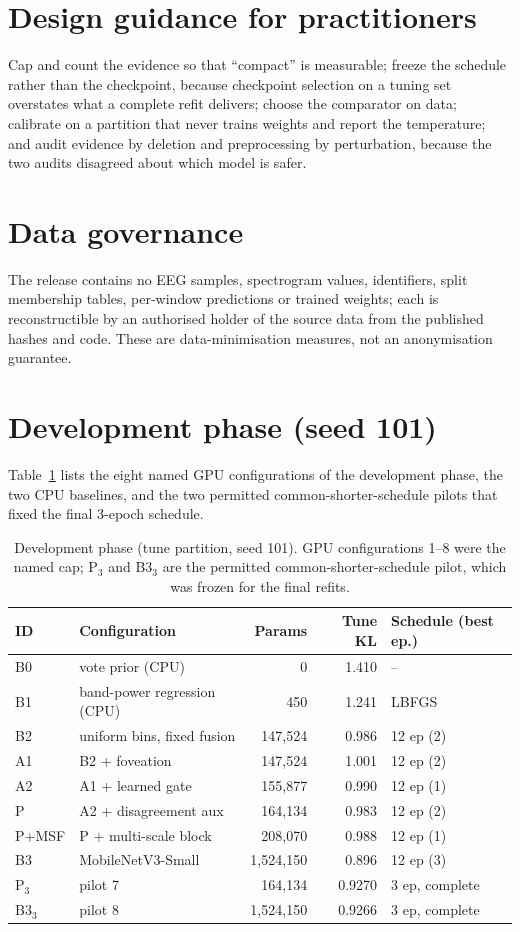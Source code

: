 \documentclass[manuscript,anonymous,nonacm]{acmart}
\begin{document}
\section{Design guidance for practitioners}
Cap and count the evidence so that ``compact'' is measurable; freeze the schedule rather than the checkpoint, because checkpoint selection on a tuning set overstates what a complete refit delivers; choose the comparator on data; calibrate on a partition that never trains weights and report the temperature; and audit evidence by deletion and preprocessing by perturbation, because the two audits disagreed about which model is safer.


\section{Data governance}
The release contains no EEG samples, spectrogram values, identifiers, split membership tables, per-window predictions or trained weights; each is reconstructible by an authorised holder of the source data from the published hashes and code. These are data-minimisation measures, not an anonymisation guarantee.


\section{Development phase (seed 101)}
Table~\ref{tab:devsup} lists the eight named GPU configurations of the development phase, the two CPU baselines, and the two permitted common-shorter-schedule pilots that fixed the final 3-epoch schedule.
\begin{table}[htbp]
\caption{Development phase (tune partition, seed 101). GPU configurations 1--8 were the named cap; P$_3$ and B3$_3$ are the permitted common-shorter-schedule pilot, which was frozen for the final refits.}
\label{tab:devsup}
\footnotesize
\setlength{\tabcolsep}{3.5pt}
\begin{tabular}{llrrl}
\toprule
ID & Configuration & Params & Tune KL & Schedule (best ep.) \\
\midrule
B0 & vote prior (CPU) & 0 & 1.410 & -- \\
B1 & band-power regression (CPU) & 450 & 1.241 & LBFGS \\
B2 & uniform bins, fixed fusion & 147,524 & 0.986 & 12 ep (2) \\
A1 & B2 + foveation & 147,524 & 1.001 & 12 ep (2) \\
A2 & A1 + learned gate & 155,877 & 0.990 & 12 ep (1) \\
P & A2 + disagreement aux & 164,134 & 0.983 & 12 ep (2) \\
P+MSF & P + multi-scale block & 208,070 & 0.988 & 12 ep (1) \\
B3 & MobileNetV3-Small & 1,524,150 & 0.896 & 12 ep (3) \\
P$_3$ & pilot 7 & 164,134 & 0.9270 & 3 ep, complete \\
B3$_3$ & pilot 8 & 1,524,150 & 0.9266 & 3 ep, complete \\
\bottomrule
\end{tabular}
\end{table}
\end{document}
